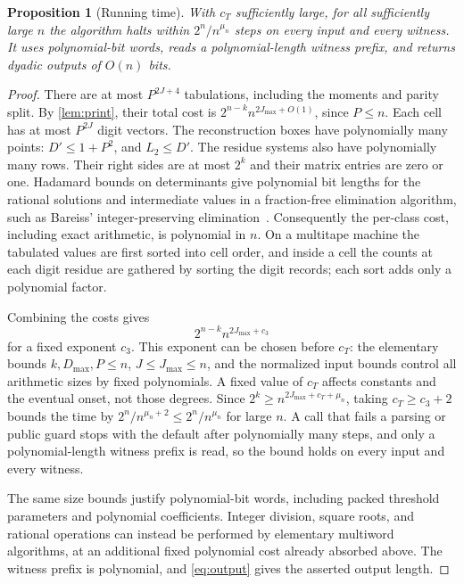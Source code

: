 \documentclass[11pt,letterpaper]{article}
\newtheorem{proposition}[theorem]{Proposition}
\theoremstyle{definition}
\theoremstyle{remark}
\begin{document}
\begin{proposition}[Running time]\label{prop:time}
With \(c_T\) sufficiently large, for all sufficiently large \(n\) the
algorithm halts within \(2^n/n^{\mu_n}\) steps on every input and every
witness. It uses polynomial-bit words, reads a polynomial-length
witness prefix, and returns dyadic outputs of \(O(n)\) bits.
\end{proposition}
\begin{proof}
There are at most \(P^{2J+4}\) tabulations, including the moments
and parity split. By \cref{lem:print}, their total cost is
\(2^{n-k}n^{2J_{\max}+O(1)}\), since \(P\le n\).
Each cell has at most \(P^{2J}\) digit vectors. The reconstruction
boxes have polynomially many points: \(D'\le1+P^2\), and
\(L_2\le D'\). The residue systems also have polynomially many rows.
Their right sides are at most \(2^k\) and their matrix entries are
zero or one. Hadamard bounds on determinants give polynomial bit
lengths for the rational solutions and intermediate values in a
fraction-free elimination algorithm, such as Bareiss' integer-preserving
elimination~\cite{Bareiss68}. Consequently the per-class
cost, including exact arithmetic, is polynomial in \(n\). On a multitape
machine the tabulated values are first sorted into cell order, and inside
a cell the counts at each digit residue are gathered by sorting the digit
records; each sort adds only a polynomial factor.

Combining the costs gives
\[
 2^{n-k}n^{2J_{\max}+c_3}
\]
for a fixed exponent \(c_3\). This exponent can be chosen before
\(c_T\): the elementary bounds \(k,D_{\max},P\le n\),
\(J\le J_{\max}\le n\), and the normalized input bounds control
all arithmetic sizes by fixed polynomials. A fixed value of
\(c_T\) affects constants and the eventual onset, not those degrees.
Since \(2^k\ge n^{2J_{\max}+c_T+\mu_n}\), taking
\(c_T\ge c_3+2\) bounds the time by
\(2^n/n^{\mu_n+2}\le2^n/n^{\mu_n}\) for large \(n\). A call that fails a
parsing or public guard stops with the default after polynomially many
steps, and only a polynomial-length witness prefix is read, so the bound
holds on every input and every witness.

The same size bounds justify polynomial-bit words, including packed
threshold parameters and polynomial coefficients. Integer division,
square roots, and rational operations can instead be performed by
elementary multiword algorithms, at an additional fixed polynomial
cost already absorbed above. The witness prefix is polynomial, and
\eqref{eq:output} gives the asserted output length.
\end{proof}
\end{document}
